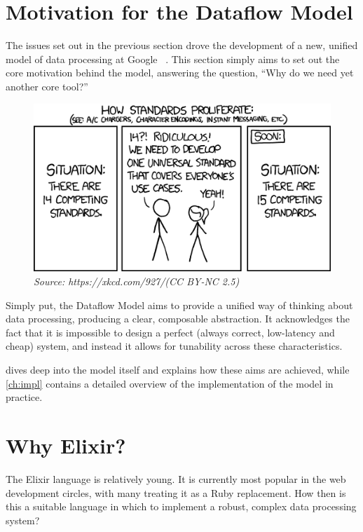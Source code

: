 \section{Motivation for the Dataflow Model}\label{sec:intro:motivation}

The issues set out in the previous section drove the development of a new, unified model of data processing at Google ~\cite{Akidau:2015}.
This section simply aims to set out the core motivation behind the model, answering the question, ``Why do we need yet another core tool?''

\begin{figure}[h]
	\centering
	\includegraphics[width=.75\textwidth]{images/xkcd-standards}
	\caption*{\textit{Source: https://xkcd.com/927/\quad(CC BY-NC 2.5)}}
\end{figure}

Simply put, the Dataflow Model aims to provide a unified way of thinking about data processing, producing a clear, composable abstraction.
It acknowledges the fact that it is impossible to design a perfect (always correct, low-latency and cheap) system, and instead it allows for tunability across these characteristics.

 dives deep into the model itself and explains how these aims are achieved, while \cref{ch:impl} contains a detailed overview of the implementation of the model in practice.

\section{Why Elixir?}\label{sec:intro:elixir}

The Elixir language \cite{Elixir} is relatively young.
It is currently most popular in the web development circles, with many treating it as a Ruby replacement.
How then is this a suitable language in which to implement a robust, complex data processing system?

